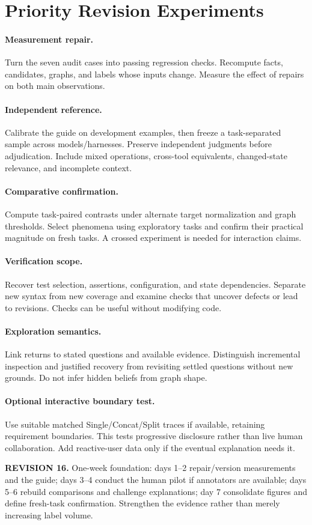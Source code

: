 \documentclass[10pt,a4paper,twocolumn]{article}
\newcommand{\rev}[2]{\par\smallskip\noindent\begin{minipage}{\linewidth}\color{revision}\footnotesize\textbf{REVISION #1.} #2\end{minipage}\par\smallskip}
\begin{document}
\section{Priority Revision Experiments}
\paragraph{Measurement repair.}
Turn the seven audit cases into passing regression checks. Recompute facts, candidates, graphs, and labels whose inputs change. Measure the effect of repairs on both main observations.
\paragraph{Independent reference.}
Calibrate the guide on development examples, then freeze a task-separated sample across models/harnesses. Preserve independent judgments before adjudication. Include mixed operations, cross-tool equivalents, changed-state relevance, and incomplete context.
\paragraph{Comparative confirmation.}
Compute task-paired contrasts under alternate target normalization and graph thresholds. Select phenomena using exploratory tasks and confirm their practical magnitude on fresh tasks. A crossed experiment is needed for interaction claims.
\paragraph{Verification scope.}
Recover test selection, assertions, configuration, and state dependencies. Separate new syntax from new coverage and examine checks that uncover defects or lead to revisions. Checks can be useful without modifying code.
\paragraph{Exploration semantics.}
Link returns to stated questions and available evidence. Distinguish incremental inspection and justified recovery from revisiting settled questions without new grounds. Do not infer hidden beliefs from graph shape.
\paragraph{Optional interactive boundary test.}
Use suitable matched Single/Concat/Split traces if available, retaining requirement boundaries. This tests progressive disclosure rather than live human collaboration. Add reactive-user data only if the eventual explanation needs it.
\rev{16}{One-week foundation: days 1--2 repair/version measurements and the guide; days 3--4 conduct the human pilot if annotators are available; days 5--6 rebuild comparisons and challenge explanations; day 7 consolidate figures and define fresh-task confirmation. Strengthen the evidence rather than merely increasing label volume.}
\end{document}

